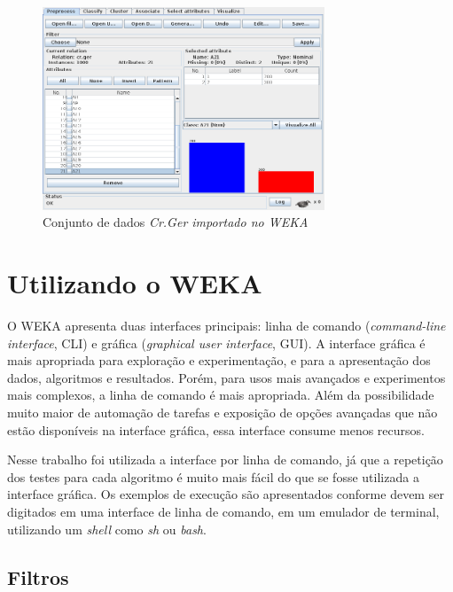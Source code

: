 \vspace{0.5cm}
\begin{figure}[h!]
    \centering
    \caption{Conjunto de dados \emph{Cr.Ger importado no WEKA}}
    \label{fig:dev_weka_arff}
    \vspace{0.5cm}
    \includegraphics[width=0.75\textwidth]{img/cr_ger.png}
    \vspace{0.5cm}
\end{figure}
\vspace{0.5cm}

\section{Utilizando o WEKA}

O WEKA apresenta duas interfaces principais: linha de comando (\emph{command-line interface}, CLI) e gráfica (\emph{graphical user interface}, GUI). A interface gráfica é mais apropriada para exploração e experimentação, e para a apresentação dos dados, algoritmos e resultados. Porém, para usos mais avançados e experimentos mais complexos, a linha de comando é mais apropriada. Além da possibilidade muito maior de automação de tarefas e exposição de opções avançadas que não estão disponíveis na interface gráfica, essa interface consume menos recursos.

Nesse trabalho foi utilizada a interface por linha de comando, já que a repetição dos testes para cada algoritmo é muito mais fácil do que se fosse utilizada a interface gráfica. Os exemplos de execução são apresentados conforme devem ser digitados em uma interface de linha de comando, em um emulador de terminal, utilizando um \emph{shell} como \emph{sh} ou \emph{bash}.

\subsection{Filtros}

